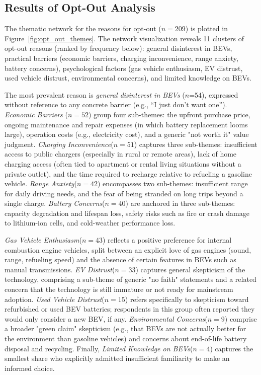 \documentclass[a4paper,fleqn]{cas-sc}   %
\begin{document}









\subsection{Results of Opt-Out Analysis}

The thematic network for the reasons for opt-out ($n=209$) is plotted in Figure~\ref{fig:opt_out_themes}. The network visualization reveals 11 clusters of opt-out reasons (ranked by frequency below): general disinterest in BEVs, practical barriers (economic barriers, charging inconvenience, range anxiety, battery concerns), psychological factors (gas vehicle enthusiasm, EV distrust, used vehicle distrust, environmental concerns), and limited knowledge on BEVs.

The most prevalent reason is \textit{general disinterest in BEVs} ($n$=54), expressed without reference to any concrete barrier (e.g., ``I just don't want one''). \textit{Economic Barriers} ($n=52$) group four sub-themes: the upfront purchase price, ongoing maintenance and repair expenses (in which battery replacement looms large), operation costs (e.g., electricity cost), and a generic "not worth it" value judgment. \textit{Charging Inconvenience}($n=51$) captures three sub-themes: insufficient access to public chargers (especially in rural or remote areas), lack of home charging access (often tied to apartment or rental living situations without a private outlet), and the time required to recharge relative to refueling a gasoline vehicle. \textit{Range Anxiety}($n=42$) encompasses two sub-themes: insufficient range for daily driving needs, and the fear of being stranded on long trips beyond a single charge.  \textit{Battery Concerns}($n=40$) are anchored in three sub-themes: capacity degradation and lifespan loss, safety risks such as fire or crash damage to lithium-ion cells, and cold-weather performance loss.

\textit{Gas Vehicle Enthusiasm}($n=43$) reflects a positive preference for internal combustion engine vehicles, split between an explicit love of gas engines (sound, range, refueling speed) and the absence of certain features in BEVs such as manual transmissions. \textit{EV Distrust}($n=33$) captures general skepticism of the technology, comprising a sub-theme of generic "no faith" statements and a related concern that the technology is still immature or not ready for mainstream adoption. \textit{Used Vehicle Distrust}($n=15$) refers specifically to skepticism toward refurbished or used BEV batteries; respondents in this group often reported they would only consider a new BEV, if any. \textit{Environmental Concerns}($n=9$) comprise a broader "green claim" skepticism (e.g., that BEVs are not actually better for the environment than gasoline vehicles) and concerns about end-of-life battery disposal and recycling. Finally, \textit{Limited Knowledge on BEVs}($n=4$) captures the smallest share who explicitly admitted insufficient familiarity to make an informed choice.
\end{document}
